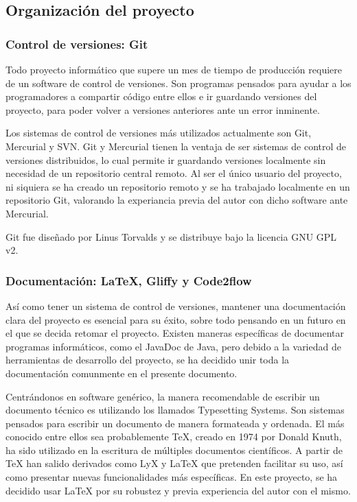 \documentclass[12pt,a4paper,openright,oneside]{article}
\numberwithin{equation}{section}
\theoremstyle{definition}
\begin{document}
\subsection{Organización del proyecto}

\subsubsection{ Control de versiones: Git }

Todo proyecto informático que supere un mes de tiempo de producción requiere de un software de control de versiones. Son programas pensados para ayudar a los programadores a compartir código entre ellos e ir guardando versiones del proyecto, para poder volver a versiones anteriores ante un error inminente.

Los sistemas de control de versiones más utilizados actualmente son Git, Mercurial y SVN. Git y Mercurial tienen la ventaja de ser sistemas de control de versiones distribuidos, lo cual permite ir guardando versiones localmente sin necesidad de un repositorio central remoto. Al ser el único usuario del proyecto, ni siquiera se ha creado un repositorio remoto y se ha trabajado localmente en un repositorio Git, valorando la experiancia previa del autor con dicho software ante Mercurial.

Git fue diseñado por Linus Torvalds y se distribuye bajo la licencia GNU GPL v2.


\subsubsection{Documentación: LaTeX, Gliffy y Code2flow}

Así como tener un sistema de control de versiones, mantener una documentación clara del proyecto es esencial para su éxito, sobre todo pensando en un futuro en el que se decida retomar el proyecto.
Existen maneras específicas de documentar programas informáticos, como el JavaDoc de Java, pero debido a la variedad de herramientas de desarrollo del proyecto, se ha decidido unir toda la documentación comunmente en el presente documento. 

Centrándonos en software genérico, la manera recomendable de escribir un documento técnico es utilizando los llamados Typesetting Systems. Son sistemas pensados para escribir un documento de manera formateada y ordenada. El más conocido entre ellos sea probablemente TeX, creado en 1974 por Donald Knuth, ha sido utilizado en la escritura de múltiples documentos científicos. A partir de TeX han salido derivados como LyX y LaTeX que pretenden facilitar su uso, así como presentar nuevas funcionalidades más específicas. 
En este proyecto, se ha decidido usar LaTeX por su robustez y previa experiencia del autor con el mismo. 
\end{document}
